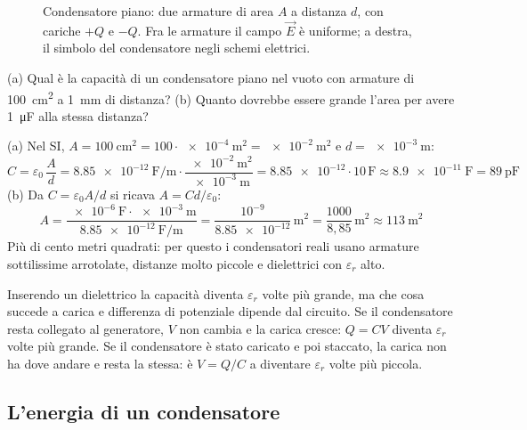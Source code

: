 \begin{figure}[h]
\centering

\caption{Condensatore piano: due armature di area $A$ a distanza $d$, con cariche $+Q$ e $-Q$. Fra le armature il campo $\vec E$ è uniforme; a destra, il simbolo del condensatore negli schemi elettrici.}
\label{fig:ud6-condensatore}
\end{figure}

\begin{esempio}
(a) Qual è la capacità di un condensatore piano nel vuoto con armature di \SI{100}{\centi\metre\squared} a \SI{1}{\milli\metre} di distanza? (b) Quanto dovrebbe essere grande l'area per avere \SI{1}{\micro\farad} alla stessa distanza?

(a) Nel SI, $A = \SI{100}{\centi\metre\squared} = 100 \cdot \SI{e-4}{\metre\squared} = \SI{e-2}{\metre\squared}$ e $d = \SI{e-3}{\metre}$:
\[
  C = \varepsilon_0\,\frac{A}{d} = \SI{8,85e-12}{\farad\per\metre} \cdot \frac{\SI{e-2}{\metre\squared}}{\SI{e-3}{\metre}} = \num{8,85e-12} \cdot 10\,\si{\farad} \approx \SI{8,9e-11}{\farad} = \SI{89}{\pico\farad}
\]
(b) Da $C = \varepsilon_0 A/d$ si ricava $A = Cd/\varepsilon_0$:
\[
  A = \frac{\SI{e-6}{\farad} \cdot \SI{e-3}{\metre}}{\SI{8,85e-12}{\farad\per\metre}} = \frac{10^{-9}}{\num{8,85e-12}}\,\si{\metre\squared} = \frac{1000}{8{,}85}\,\si{\metre\squared} \approx \SI{113}{\metre\squared}
\]
Più di cento metri quadrati: per questo i condensatori reali usano armature sottilissime arrotolate, distanze molto piccole e dielettrici con $\varepsilon_r$ alto.
\end{esempio}

\begin{attenzione}
Inserendo un dielettrico la capacità diventa $\varepsilon_r$ volte più grande, ma che cosa succede a carica e differenza di potenziale dipende dal circuito. Se il condensatore resta collegato al generatore, $V$ non cambia e la carica cresce: $Q = CV$ diventa $\varepsilon_r$ volte più grande. Se il condensatore è stato caricato e poi staccato, la carica non ha dove andare e resta la stessa: è $V = Q/C$ a diventare $\varepsilon_r$ volte più piccola.
\end{attenzione}



\subsection{L'energia di un condensatore}

